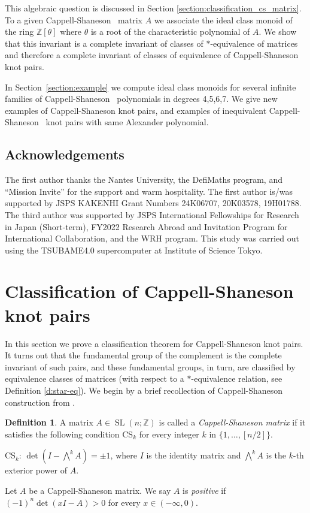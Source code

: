 \documentclass[12pt]{amsart}
\newcommand{\bc}{}
\newcommand{\cs}{Cappell-Shaneson:1976-1}
\newcommand{\csss}{Cappell-Shaneson~ }
\theoremstyle{plain}
\theoremstyle{definition}
\newtheorem{definition}[theorem]{Definition}
\theoremstyle{remark}
\newcommand{\zz}{{\mathbb{Z}}}
\renewcommand{\(}{\big(}
\renewcommand{\)}{\big)}
\theoremstyle{plain}
\theoremstyle{definition}
\begin{document}
{\bc
This algebraic question is discussed in Section
\ref{section:classification_cs_matrix}.
To a given \csss matrix $A$ we associate
the ideal class monoid of the ring $\zz[\theta]$
where $\theta$ is a root of the characteristic polynomial of $A$.
We show that this invariant is a complete invariant of classes of
$*$-equivalence of matrices and therefore a complete invariant
of classes of equivalence of \csss knot pairs.



In Section~\ref{section:example} we compute ideal class monoids for several infinite families of
\csss polynomials in degrees 4,5,6,7. We give new examples of Cappell-Shaneson
knot pairs, and examples of inequivalent \csss knot pairs with same Alexander polynomial.
}

\subsection*{Acknowledgements}
The first author thanks the Nantes University, the DefiMaths program, and 
``Mission Invite'' for the support and warm hospitality. 
The first author is/was supported by JSPS KAKENHI Grant Numbers 
24K06707, 20K03578, 19H01788.
The third author was supported by JSPS International Fellowships for Research in Japan 
(Short-term), FY2022 Research Abroad and Invitation Program for International Collaboration, 
and the WRH program. 
This study was carried out using the TSUBAME4.0 supercomputer at Institute of Science Tokyo.


\section{Classification of Cappell-Shaneson knot pairs}\label{section:geometry}

In this section we prove a classification theorem for
 Cappell-Shaneson knot pairs.
It turns out  that the fundamental group of the complement is the complete invariant of such pairs, and these fundamental groups, in turn, are classified by equivalence classes of matrices
(with respect to a $*$-equivalence relation, see Definition
\ref{d:star-eq}).
We begin by a brief recollection of Cappell-Shaneson construction from \cite{\cs}.


\begin{definition}\label{definition:Cappell-Shaneson matrix}
{\bc A matrix }
$A \in \operatorname{SL}(n;\mathbb{Z})$ is called a \textit{Cappell-Shaneson matrix} if it satisfies the following condition $\mathrm{CS}_k$ for every integer $k$ in $\{ 1, \ldots, [n/2]\}$.

$\mathrm{CS}_k$: $\det(I- \bigwedge^k A)=\pm1$, where $I$ is the identity matrix and $\bigwedge^k A$ is the $k$-th exterior power of $A$.

Let $A$ be a Cappell-Shaneson matrix. We say $A$ is \textit{positive} if $(-1)^n \det(xI - A) > 0$ for every $x\in (-\infty,0)$.
\end{definition}
\end{document}
